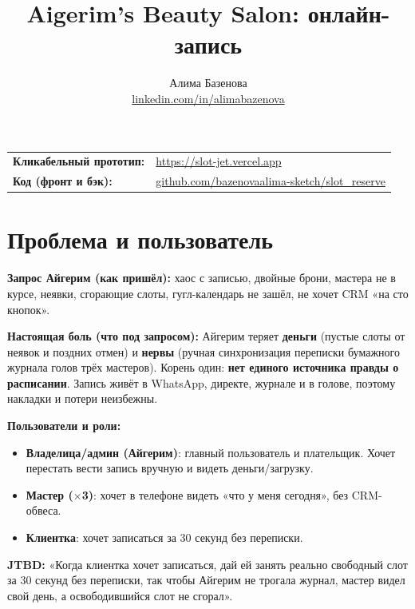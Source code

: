 \documentclass[11pt,a4paper]{article}
\title{\vspace{-1.5cm}\textbf{\color{brand}Aigerim's Beauty Salon: онлайн-запись}}
\author{Алима Базенова \\ \href{https://www.linkedin.com/in/alimabazenova/}{linkedin.com/in/alimabazenova}}
\date{}
\newcommand{\arr}{\textrightarrow{}}
\begin{document}
\maketitle
\vspace{-1cm}

\begin{center}
\begin{tabular}{ll}
\textbf{Кликабельный прототип:} & \href{https://slot-jet.vercel.app}{https://slot-jet.vercel.app} \\
\textbf{Код (фронт и бэк):} & \href{https://github.com/bazenovaalima-sketch/slot_reserve}{github.com/bazenovaalima-sketch/slot\_reserve} \\
\end{tabular}
\end{center}

\hrulefill

\section{Проблема и пользователь}

\textbf{Запрос Айгерим (как пришёл):} хаос с записью, двойные брони, мастера не в курсе, неявки, сгорающие слоты, гугл-календарь не зашёл, не хочет CRM «на сто кнопок».

\textbf{Настоящая боль (что под запросом):} Айгерим теряет \textbf{деньги} (пустые слоты от неявок и поздних отмен) и \textbf{нервы} (ручная синхронизация переписки \arr{} бумажного журнала \arr{} голов трёх мастеров). Корень один: \textbf{нет единого источника правды о расписании}. Запись живёт в WhatsApp, директе, журнале и в голове, поэтому накладки и потери неизбежны.

\textbf{Пользователи и роли:}
\begin{itemize}
  \item \textbf{Владелица/админ (Айгерим)}: главный пользователь и плательщик. Хочет перестать вести запись вручную и видеть деньги/загрузку.
  \item \textbf{Мастер ($\times$3)}: хочет в телефоне видеть «что у меня сегодня», без CRM-обвеса.
  \item \textbf{Клиентка}: хочет записаться за 30 секунд без переписки.
\end{itemize}

\textbf{JTBD:} «Когда клиентка хочет записаться, дай ей занять реально свободный слот за 30 секунд без переписки, так чтобы Айгерим не трогала журнал, мастер видел свой день, а освободившийся слот не сгорал».
\end{document}
